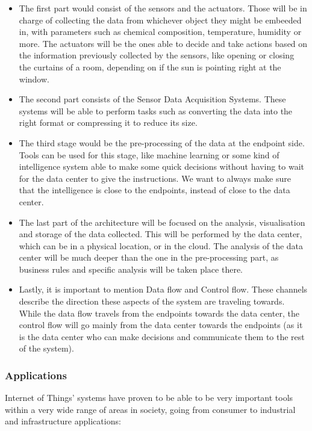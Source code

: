 \documentclass[12pt]{article}
\begin{document}
\begin{itemize}
    \item The first part would consist of the sensors and the actuators. Those will be in charge of collecting the data from whichever object they might be embeeded in, with parameters such as chemical composition, temperature, humidity or more. The actuators will be the ones able to decide and take actions based on the information previously collected by the sensors, like opening or closing the curtains of a room, depending on if the sun is pointing right at the window. 
    \item The second part consists of the Sensor Data Acquisition Systems. These systems will be able to perform tasks such as converting the data into the right format or compressing it to reduce its size.
    \item The third stage would be the pre-processing of the data at the endpoint side. Tools can be used for this stage, like machine learning or some kind of intelligence system able to make some quick decisions without having to wait for the data center to give the instructions. We want to always make sure that the intelligence is close to the endpoints, instead of close to the data center. 
    \item The last part of the architecture will be focused on the analysis, visualisation and storage of the data collected. This will be performed by the data center, which can be in a physical location, or in the cloud. The analysis of the data center will be much deeper than the one in the pre-processing part, as business rules and specific analysis will be taken place there.
    \item Lastly, it is important to mention Data flow and Control flow. These channels describe the direction these aspects of the system are traveling towards. While the data flow travels from the endpoints towards the data center, the control flow will go mainly from the data center towards the endpoints (as it is the data center who can make decisions and communicate them to the rest of the system).
\end{itemize}

\subsubsection{Applications}

Internet of Things' systems have proven to be able to be very important tools within a very wide range of areas in society, going from consumer to industrial and infrastructure applications:
\end{document}
